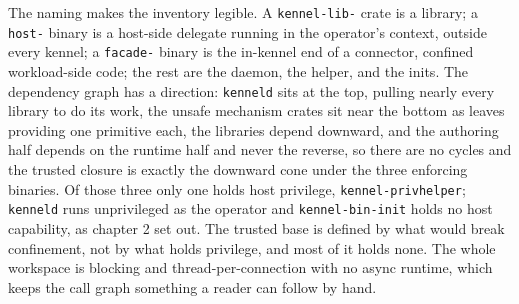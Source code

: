 The naming makes the inventory legible. A \texttt{kennel-lib-} crate is
a library; a \texttt{host-} binary is a host-side delegate running in
the operator's context, outside every kennel; a \texttt{facade-} binary
is the in-kennel end of a connector, confined workload-side code; the
rest are the daemon, the helper, and the inits. The dependency graph has
a direction: \texttt{kenneld} sits at the top, pulling nearly every
library to do its work, the unsafe mechanism crates sit near the bottom
as leaves providing one primitive each, the libraries depend downward,
and the authoring half depends on the runtime half and never the
reverse, so there are no cycles and the trusted closure is exactly the
downward cone under the three enforcing binaries. Of those three only
one holds host privilege, \texttt{kennel-privhelper}; \texttt{kenneld}
runs unprivileged as the operator and \texttt{kennel-bin-init} holds no
host capability, as chapter 2 set out. The trusted base is defined by
what would break confinement, not by what holds privilege, and most of
it holds none. The whole workspace is blocking and thread-per-connection
with no async runtime, which keeps the call graph something a reader can
follow by hand.

